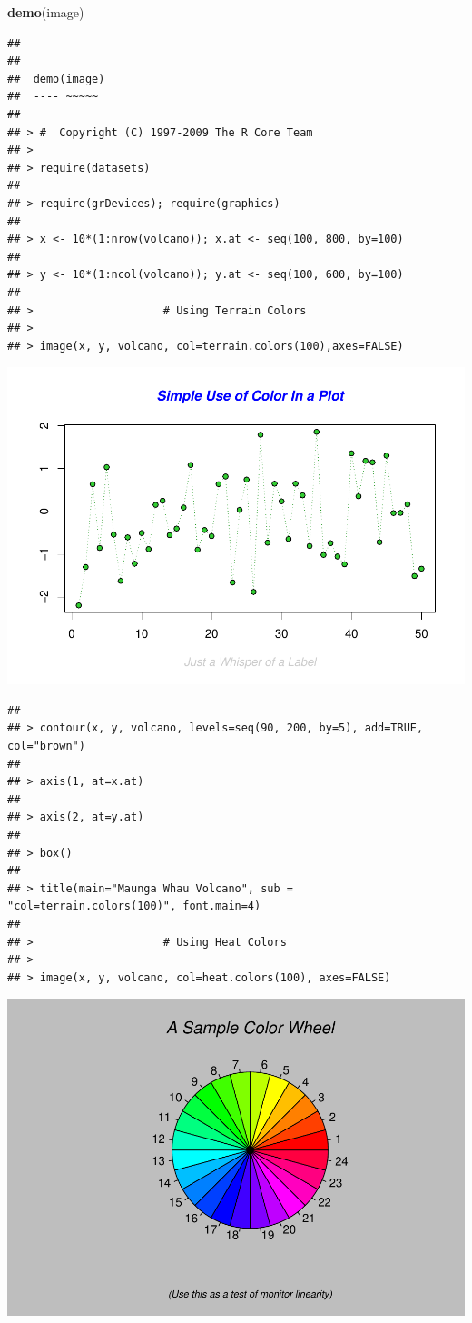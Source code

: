 \documentclass[
]{book}
\newenvironment{Shaded}{\begin{snugshade}}{\end{snugshade}}
\newcommand{\KeywordTok}[1]{\textcolor[rgb]{0.13,0.29,0.53}{\textbf{#1}}}
\newcommand{\NormalTok}[1]{#1}
\begin{document}
\begin{Shaded}
\begin{Highlighting}[]
\KeywordTok{demo}\NormalTok{(image)}
\end{Highlighting}
\end{Shaded}

\begin{verbatim}
## 
## 
##  demo(image)
##  ---- ~~~~~
## 
## > #  Copyright (C) 1997-2009 The R Core Team
## > 
## > require(datasets)
## 
## > require(grDevices); require(graphics)
## 
## > x <- 10*(1:nrow(volcano)); x.at <- seq(100, 800, by=100)
## 
## > y <- 10*(1:ncol(volcano)); y.at <- seq(100, 600, by=100)
## 
## >                    # Using Terrain Colors
## > 
## > image(x, y, volcano, col=terrain.colors(100),axes=FALSE)
\end{verbatim}

\includegraphics{TudodoR_files/figure-latex/unnamed-chunk-147-1.pdf}

\begin{verbatim}
## 
## > contour(x, y, volcano, levels=seq(90, 200, by=5), add=TRUE, col="brown")
## 
## > axis(1, at=x.at)
## 
## > axis(2, at=y.at)
## 
## > box()
## 
## > title(main="Maunga Whau Volcano", sub = "col=terrain.colors(100)", font.main=4)
## 
## >                    # Using Heat Colors
## > 
## > image(x, y, volcano, col=heat.colors(100), axes=FALSE)
\end{verbatim}

\includegraphics{TudodoR_files/figure-latex/unnamed-chunk-147-2.pdf}
\end{document}
